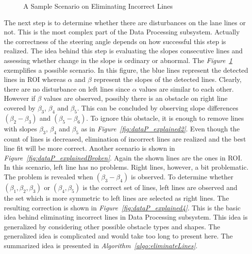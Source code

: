 \documentclass[a4paper,12pt]{article}
\begin{document}
\begin{enumerate}
\begin{figure}[b!]
\begin{subfigure}{.46\textwidth}
\end{subfigure}

\caption{\label{fig:dataP_explained} A Sample Scenario on Eliminating Incorrect Lines}

\end{figure}





The next step is to determine whether there are disturbances on the lane lines or not. This is the most complex part of the Data Processing subsystem. Actually the correctness of the steering angle depends on how successful this step is realized. The idea behind this step is evaluating the slopes consecutive lines and assessing whether change in the slope is ordinary or abnormal. The \textit{Figure~\ref{fig:dataP_explained}} exemplifies a possible scenario. In this figure, the blue lines represent the detected lines in ROI whereas $\alpha$ and $\beta$ represent the slopes of the detected lines. Clearly, there are no disturbance on left lines since $\alpha$ values are similar to each other. However if $\beta$ values are observed, possibly there is an obstacle on right line covered by $\beta_3$, $\beta_4$ and $\beta_5$. This can be concluded by observing slope differences $(\beta_2 - \beta_3)$ and $(\beta_5 - \beta_6)$. To ignore this obstacle, it is enough to remove lines with slopes $\beta_3$, $\beta_4$ and $\beta_5$ as in \textit{Figure~\ref{fig:dataP_explained2}}. Even though the count of lines is decreased, elimination of incorrect lines are realized and the best line fit will be more correct. Another scenario is shown in \textit{Figure~\ref{fig:dataP_explainedBroken}}. Again the shown lines are the ones in ROI. In this scenario, left line has no problems. Right lines, however, a bit problematic. The problem is revealed when  $(\beta_3 - \beta_4)$ is observed. To determine whether  $(\beta_1, \beta_2, \beta_3)$ or $(\beta_4, \beta_5)$ is the correct set of lines, left lines are observed and the set which is more symmetric to left lines are selected as right lines. The resulting correction is shown in \textit{Figure~\ref{fig:dataP_explained4}}.	This is the basic idea behind eliminating incorrect lines in Data Processing subsystem. This idea is generalized by considering other possible obstacle types and shapes. The generalized idea is complicated and would take too long to present here. The summarized idea is presented in \textit{Algorithm~\ref{algo:eliminateLines}}.

\begin{figure}[h!]


\end{figure}
\end{enumerate}
\end{document}
